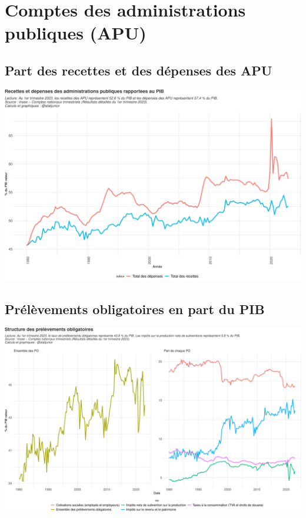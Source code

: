 \documentclass[
  paper=a4,
  ,captions=tableheading
]{scrartcl}
\begin{document}
\newpage

\hypertarget{comptes-des-administrations-publiques-apu}{%
\section{Comptes des administrations publiques
(APU)}\label{comptes-des-administrations-publiques-apu}}

\hypertarget{part-des-recettes-et-des-duxe9penses-des-apu}{%
\subsection{Part des recettes et des dépenses des
APU}\label{part-des-recettes-et-des-duxe9penses-des-apu}}

\includegraphics{rapport_pdf_csi_files/figure-latex/unnamed-chunk-9-1.pdf}

\hypertarget{pruxe9luxe8vements-obligatoires-en-part-du-pib}{%
\subsection{Prélèvements obligatoires en part du
PIB}\label{pruxe9luxe8vements-obligatoires-en-part-du-pib}}

\includegraphics{rapport_pdf_csi_files/figure-latex/unnamed-chunk-10-1.pdf}
\end{document}
